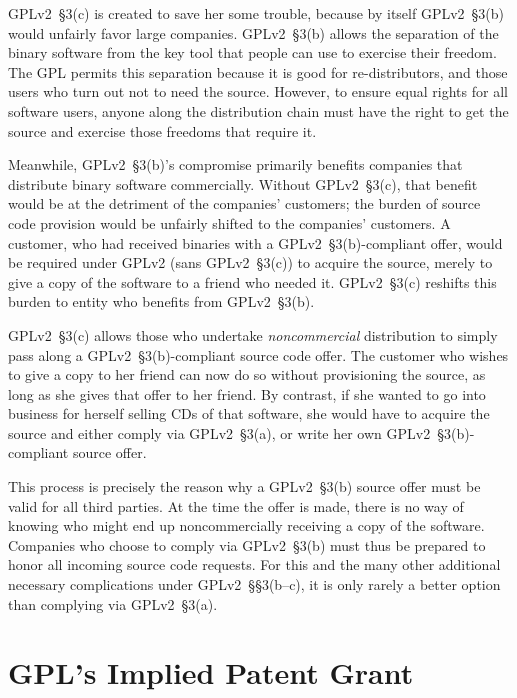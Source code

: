 GPLv2~\S3(c) is created to save her some trouble, because by itself GPLv2~\S3(b)
would unfairly favor large companies.  GPLv2~\S3(b) allows the
separation of the binary software from the key tool that people can use
to exercise their freedom. The GPL permits this separation because it is
good for re-distributors, and those users who turn out not to need the
source.  However, to ensure equal rights for all software users, anyone
along the distribution chain must have the right to get the source and
exercise those freedoms that require it.

Meanwhile, GPLv2~\S3(b)'s compromise primarily benefits companies that
distribute binary software commercially.  Without GPLv2~\S3(c), that benefit
would be at the detriment of the companies' customers; the burden of
source code provision would be unfairly shifted to the companies'
customers.  A customer, who had received binaries with a GPLv2~\S3(b)-compliant
offer, would be required under GPLv2 (sans GPLv2~\S3(c)) to acquire the source,
merely to give a copy of the software to a friend who needed it.  GPLv2~\S3(c)
reshifts this burden to entity who benefits from GPLv2~\S3(b).

GPLv2~\S3(c) allows those who undertake \emph{noncommercial} distribution to
simply pass along a GPLv2~\S3(b)-compliant source code offer.  The customer who
wishes to give a copy to her friend can now do so without provisioning the
source, as long as she gives that offer to her friend.  By contrast, if
she wanted to go into business for herself selling CDs of that software,
she would have to acquire the source and either comply via GPLv2~\S3(a), or
write her own GPLv2~\S3(b)-compliant source offer.

This process is precisely the reason why a GPLv2~\S3(b) source offer must be
valid for all third parties.  At the time the offer is made, there is no
way of knowing who might end up noncommercially receiving a copy of the
software.  Companies who choose to comply via GPLv2~\S3(b) must thus be
prepared to honor all incoming source code requests.  For this and the
many other additional necessary complications under GPLv2~\S\S3(b--c), it is
only rarely a better option than complying via GPLv2~\S3(a).

\chapter{GPL's Implied Patent Grant}
\label{gpl-implied-patent-grant}

